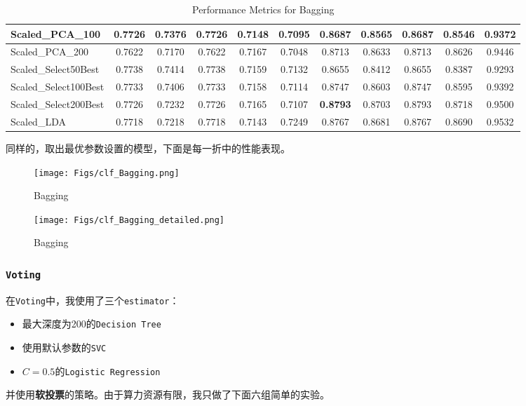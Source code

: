\documentclass[12pt, a4paper, oneside]{ctexart}
\begin{document}
\begin{table}[H]
{\begin{tabular}{|l|c|c|c|c|c|c|c|c|c|c|}
    Scaled\_PCA\_100 & 0.7726 & 0.7376 & 0.7726 & 0.7148 & 0.7095 & 0.8687 & 0.8565 & 0.8687 & 0.8546 & 0.9372 \\ \hline
    Scaled\_PCA\_200 & 0.7622 & 0.7170 & 0.7622 & 0.7167 & 0.7048 & 0.8713 & 0.8633 & 0.8713 & 0.8626 & 0.9446 \\ \hline
    Scaled\_Select50Best & 0.7738 & 0.7414 & 0.7738 & 0.7159 & 0.7132 & 0.8655 & 0.8412 & 0.8655 & 0.8387 & 0.9293 \\ \hline
    Scaled\_Select100Best & 0.7733 & 0.7406 & 0.7733 & 0.7158 & 0.7114 & 0.8747 & 0.8603 & 0.8747 & 0.8595 & 0.9392 \\ \hline
    Scaled\_Select200Best & 0.7726 & 0.7232 & 0.7726 & 0.7165 & 0.7107 & \textbf{0.8793} & 0.8703 & 0.8793 & 0.8718 & 0.9500 \\ \hline
    Scaled\_LDA & 0.7718 & 0.7218 & 0.7718 & 0.7143 & 0.7249 & 0.8767 & 0.8681 & 0.8767 & 0.8690 & 0.9532 \\ \hline
    \end{tabular}
    }
    \caption{Performance Metrics for Bagging}
\end{table}

同样的，取出最优参数设置的模型，下面是每一折中的性能表现。

\begin{figure}[H]
    \centering
    \texttt{[image: Figs/clf\_Bagging.png]}
    \caption{Bagging}
\end{figure}

\begin{figure}[H]
    \centering
    \texttt{[image: Figs/clf\_Bagging\_detailed.png]}
    \caption{Bagging}
\end{figure}

\subsubsection{\texttt{Voting}}
在\texttt{Voting}中，我使用了三个\texttt{estimator}：
\begin{itemize}
    \item 最大深度为200的\texttt{Decision Tree}
    \item 使用默认参数的\texttt{SVC}
    \item $C=0.5$的\texttt{Logistic Regression}
\end{itemize}
并使用\textbf{软投票}的策略。由于算力资源有限，我只做了下面六组简单的实验。
\end{document}
